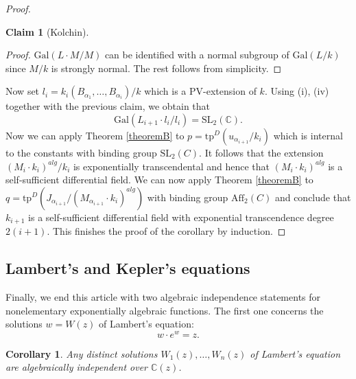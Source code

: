 \documentclass[12pt]{amsart}
\theoremstyle{definition}
\theoremstyle{plain}
\newtheorem{cor}[defn]{Corollary}
\newtheorem*{claim}{Claim}
\theoremstyle{exampstyle}\newtheorem{thmx}{Theorem}
\theoremstyle{exampstyle}\newtheorem{thmxbis}{Theorem}
\begin{document}
\begin{proof}
\begin{claim}[Kolchin]
\end{claim}
\begin{proof} 
$\mathrm{Gal}(L \cdot M/M)$ can be identified with a normal subgroup of $\mathrm{Gal}(L/k)$ since $M/k$ is strongly normal. The rest follows from simplicity.
\end{proof} 
Now set $l_i = k_i (B_{\alpha_1}, \ldots, B_{\alpha_i})/k$ which is a PV-extension of $k$. Using (i), (iv) together with the previous claim, we obtain that
$$\mathrm{Gal}(L_{i+1} \cdot l_i/l_i) = \mathrm{SL}_2(\mathbb{C}).$$ 
Now we can apply Theorem \ref{theoremB} to $p = \mathrm{tp}^D(u_{\alpha_{i+1}}/k_i)$ which is internal to the constants with binding group $\mathrm{SL}_2(C)$. It follows that the extension $(M_{i}\cdot k_i)^{alg}/k_i$ is exponentially transcendental and hence that $(M_{i}\cdot k_i)^{alg}$ is a self-sufficient differential field. We can now apply Theorem \ref{theoremB} to $q = \mathrm{tp}^D(J_{\alpha_{i+1}}/(M_{\alpha_{i+1}} \cdot k_i)^{alg})$ with binding group $\mathrm{Aff}_2(C)$ and conclude that $k_{i+1}$ is a self-sufficient differential field with exponential transcendence degree $2(i+1)$. This finishes the proof of the corollary by induction.
\end{proof} 
 

\subsection{Lambert's and Kepler's equations} Finally, we end this article with two algebraic independence statements for nonelementary exponentially algebraic functions. The first one concerns the solutions $w = W(z)$ of Lambert's equation: 
$$ w \cdot e^w = z.$$


\begin{cor} \label{cor-algind-Lambert}
Any distinct solutions $W_1(z),\ldots, W_n(z)$ of Lambert's equation are algebraically independent over $\mathbb{C}(z)$. 
\end{cor} 
\end{document}
